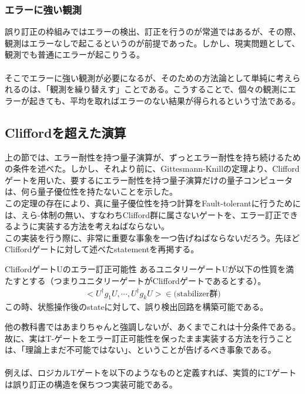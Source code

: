 \documentclass[a4paper,10.5pt]{article}
\numberwithin{equation}{section}
\begin{document}
\subsubsection{エラーに強い観測}
誤り訂正の枠組みではエラーの検出、訂正を行うのが常道ではあるが、その際、観測はエラーなしで起こるというのが前提であった。しかし、現実問題として、観測でも普通にエラーが起こりうる。\\
\\
そこでエラーに強い観測が必要になるが、そのための方法論として単純に考えられるのは、「観測を繰り替えす」ことである。こうすることで、個々の観測にエラーが起きても、平均を取ればエラーのない結果が得られるという寸法である。


\subsection{Cliffordを超えた演算}
上の節では、エラー耐性を持つ量子演算が、ずっとエラー耐性を持ち続けるための条件を述べた。しかし、それより前に、Gittesmann-Knillの定理より、Cliffordゲートを用いた、要するにエラー耐性を持つ量子演算だけの量子コンピュータは、何ら量子優位性を持たないことを示した。\\
この定理の存在により、真に量子優位性を持つ計算をFault-tolerantに行うためには、えら-体制の無い、すなわちClifford群に属さないゲートを、エラー訂正できるように実装する方法を考えねばならない。
\\
この実装を行う際に、非常に重要な事象を一つ告げねばならないだろう。先ほどCliffordゲートに対して述べたstatementを再掲する。
\begin{resultbox}{CliffordゲートUのエラー訂正可能性}
    あるユニタリーゲートUが以下の性質を満たすとする（つまりユニタリーゲートがCliffordゲートであるとする）。
    \begin{align*}
        <U^{\dagger}g_{1}U,\cdots ,U^{\dagger}g_{k}U> \in \text{(stabilizer群)}
    \end{align*}
    この時、状態操作後のstateに対して、誤り検出回路を構築可能である。
\end{resultbox}
他の教科書ではあまりちゃんと強調しないが、あくまでこれは十分条件である。故に、実はT-ゲートをエラー訂正可能性を保ったまま実装する方法を行うことは、「理論上まだ不可能ではない」、ということが告げるべき事象である。\\
\\
例えば、ロジカルTゲートを以下のようなものと定義すれば、実質的にTゲートは誤り訂正の構造を保ちつつ実装可能である。
\end{document}
